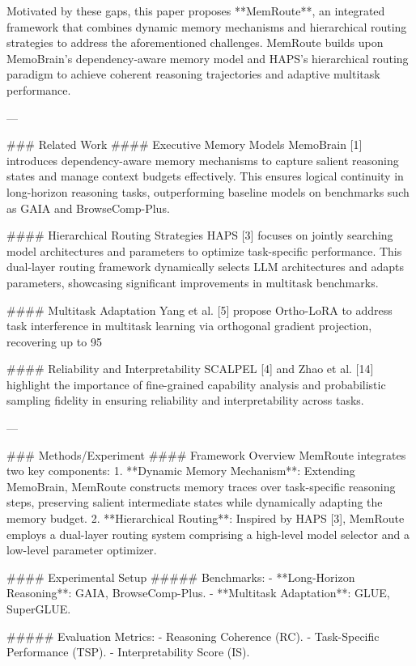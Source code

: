 Motivated by these gaps, this paper proposes **MemRoute**, an integrated framework that combines dynamic memory mechanisms and hierarchical routing strategies to address the aforementioned challenges. MemRoute builds upon MemoBrain's dependency-aware memory model and HAPS's hierarchical routing paradigm to achieve coherent reasoning trajectories and adaptive multitask performance.

---

### Related Work  
#### Executive Memory Models  
MemoBrain [1] introduces dependency-aware memory mechanisms to capture salient reasoning states and manage context budgets effectively. This ensures logical continuity in long-horizon reasoning tasks, outperforming baseline models on benchmarks such as GAIA and BrowseComp-Plus.

#### Hierarchical Routing Strategies  
HAPS [3] focuses on jointly searching model architectures and parameters to optimize task-specific performance. This dual-layer routing framework dynamically selects LLM architectures and adapts parameters, showcasing significant improvements in multitask benchmarks.

#### Multitask Adaptation  
Yang et al. [5] propose Ortho-LoRA to address task interference in multitask learning via orthogonal gradient projection, recovering up to 95%

#### Reliability and Interpretability  
SCALPEL [4] and Zhao et al. [14] highlight the importance of fine-grained capability analysis and probabilistic sampling fidelity in ensuring reliability and interpretability across tasks.

---

### Methods/Experiment  
#### Framework Overview  
MemRoute integrates two key components:  
1. **Dynamic Memory Mechanism**: Extending MemoBrain, MemRoute constructs memory traces over task-specific reasoning steps, preserving salient intermediate states while dynamically adapting the memory budget.  
2. **Hierarchical Routing**: Inspired by HAPS [3], MemRoute employs a dual-layer routing system comprising a high-level model selector and a low-level parameter optimizer.  

#### Experimental Setup  
##### Benchmarks:  
- **Long-Horizon Reasoning**: GAIA, BrowseComp-Plus.  
- **Multitask Adaptation**: GLUE, SuperGLUE.  

##### Evaluation Metrics:  
- Reasoning Coherence (RC).  
- Task-Specific Performance (TSP).  
- Interpretability Score (IS).  

